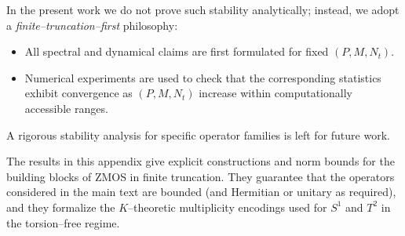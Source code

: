 \documentclass[11pt]{article}
\begin{document}
In the present work we do not prove such stability analytically; instead, we adopt a \emph{finite--truncation--first} philosophy:
\begin{itemize}
  \item All spectral and dynamical claims are first formulated for fixed $(P,M,N_t)$.
  \item Numerical experiments are used to check that the corresponding statistics exhibit convergence as $(P,M,N_t)$ increase within computationally accessible ranges.
\end{itemize}
A rigorous stability analysis for specific operator families is left for future work.

\bigskip

The results in this appendix give explicit constructions and norm bounds for the building blocks of ZMOS in finite truncation.
They guarantee that the operators considered in the main text are bounded (and Hermitian or unitary as required), and they formalize the $K$--theoretic multiplicity encodings used for $S^1$ and $T^2$ in the torsion--free regime.


\nocite{*}


\end{document}
